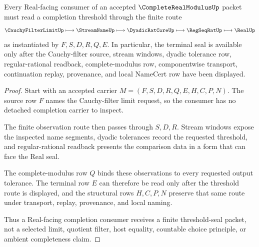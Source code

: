 \begin{theorem}
\label{thm:complete-real-modulus-threshold-seal-route}
Every Real-facing consumer of an accepted $\CompleteRealModulusUp$ packet must read a completion threshold through the finite route
$$
\CauchyFilterLimitUp \longmapsto \StreamNameUp \longmapsto \DyadicRatCoreUp \longmapsto \RegSeqRatUp \longmapsto \RealUp
$$
as instantiated by $F,S,D,R,Q,E$. In particular, the terminal seal is available only after the Cauchy-filter source, stream windows, dyadic tolerance row, regular-rational readback, complete-modulus row, componentwise transport, continuation replay, provenance, and local NameCert row have been displayed.
\end{theorem}
\begin{proof}
Start with an accepted carrier $M=(F,S,D,R,Q,E,H,C,P,N)$. The source row $F$ names the Cauchy-filter limit request, so the consumer has no detached completion carrier to inspect.

The finite observation route then passes through $S,D,R$. Stream windows expose the inspected name segments, dyadic tolerances record the requested threshold, and regular-rational readback presents the comparison data in a form that can face the Real seal.

The complete-modulus row $Q$ binds these observations to every requested output tolerance. The terminal row $E$ can therefore be read only after the threshold route is displayed, and the structural rows $H,C,P,N$ preserve that same route under transport, replay, provenance, and local naming.

Thus a Real-facing completion consumer receives a finite threshold-seal packet, not a selected limit, quotient filter, host equality, countable choice principle, or ambient completeness claim.
\end{proof}




